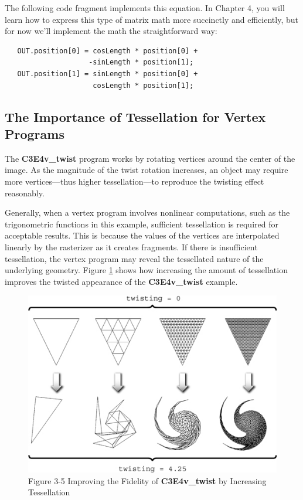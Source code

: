 \documentclass{book}
\begin{document}
The following code fragment implements this equation. In Chapter 4, you will learn how to express this type of matrix math more succinctly and efficiently, but for now we'll implement the math the straightforward way:

\FloatBarrier
\begin{lstlisting}
   OUT.position[0] = cosLength * position[0] +
                    -sinLength * position[1];
   OUT.position[1] = sinLength * position[0] +
                     cosLength * position[1];
\end{lstlisting}
\FloatBarrier

\subsection*{The Importance of Tessellation for Vertex Programs}

The \textbf{C3E4v_twist} program works by rotating vertices around the center of the image. As the magnitude of the twist rotation increases, an object may require more vertices—thus higher tessellation—to reproduce the twisting effect reasonably.

Generally, when a vertex program involves nonlinear computations, such as the trigonometric functions in this example, sufficient tessellation is required for acceptable results. This is because the values of the vertices are interpolated linearly by the rasterizer as it creates fragments. If there is insufficient tessellation, the vertex program may reveal the tessellated nature of the underlying geometry. Figure \ref{fig:3-5} shows how increasing the amount of tessellation improves the twisted appearance of the \textbf{C3E4v_twist} example.

\begin{figure}
    \centering
    \includegraphics[width=1\linewidth]{Images/fig3_5.jpg}
    \caption{Figure 3-5 Improving the Fidelity of \textbf{C3E4v_twist} by Increasing Tessellation}
    \label{fig:3-5}
\end{figure}
\end{document}

